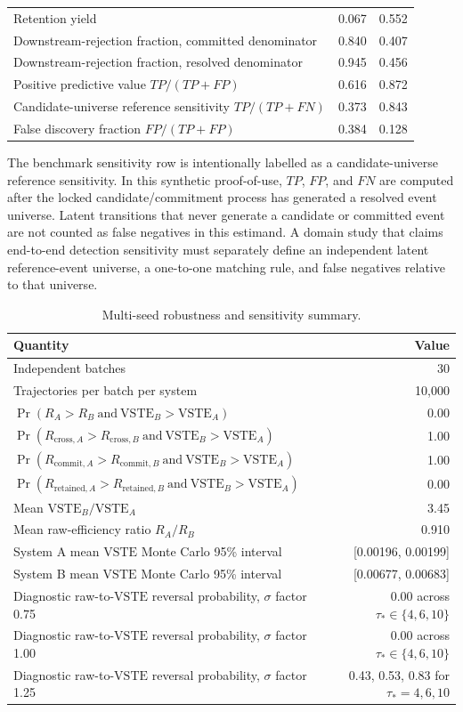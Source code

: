 \documentclass[11pt,a4paper]{article}
\newcommand{\VSTE}{\ensuremath{\mathrm{VSTE}}}
\newcommand{\1}{\mathbf{1}}
\begin{document}
\begin{table}[h]
\begin{tabular}{lrr}
Retention yield & 0.067 & 0.552 \\
Downstream-rejection fraction, committed denominator & 0.840 & 0.407 \\
Downstream-rejection fraction, resolved denominator & 0.945 & 0.456 \\
Positive predictive value $TP/(TP+FP)$ & 0.616 & 0.872 \\
Candidate-universe reference sensitivity $TP/(TP+FN)$ & 0.373 & 0.843 \\
False discovery fraction $FP/(TP+FP)$ & 0.384 & 0.128 \\
\bottomrule
\end{tabular}
\end{table}

The benchmark sensitivity row is intentionally labelled as a candidate-universe
reference sensitivity. In this synthetic proof-of-use, $TP$, $FP$, and $FN$ are
computed after the locked candidate/commitment process has generated a resolved
event universe. Latent transitions that never generate a candidate or committed
event are not counted as false negatives in this estimand. A domain study that
claims end-to-end detection sensitivity must separately define an independent
latent reference-event universe, a one-to-one matching rule, and false negatives
relative to that universe.

\begin{table}[h]
\centering
\caption{Multi-seed robustness and sensitivity summary.}
\label{tab:hmm-robustness}
\begin{tabular}{lr}
\toprule
Quantity & Value \\
\midrule
Independent batches & 30 \\
Trajectories per batch per system & 10,000 \\
$\Pr(R_A>R_B\ \mathrm{and}\ \VSTE_B>\VSTE_A)$ & 0.00 \\
$\Pr(R_{\mathrm{cross},A}>R_{\mathrm{cross},B}\ \mathrm{and}\ \VSTE_B>\VSTE_A)$ & 1.00 \\
$\Pr(R_{\mathrm{commit},A}>R_{\mathrm{commit},B}\ \mathrm{and}\ \VSTE_B>\VSTE_A)$ & 1.00 \\
$\Pr(R_{\mathrm{retained},A}>R_{\mathrm{retained},B}\ \mathrm{and}\ \VSTE_B>\VSTE_A)$ & 0.00 \\
Mean $\VSTE_B/\VSTE_A$ & 3.45 \\
Mean raw-efficiency ratio $R_A/R_B$ & 0.910 \\
System A mean \VSTE{} Monte Carlo 95\% interval & [0.00196, 0.00199] \\
System B mean \VSTE{} Monte Carlo 95\% interval & [0.00677, 0.00683] \\
Diagnostic raw-to-\VSTE{} reversal probability, $\sigma$ factor 0.75 & 0.00 across $\tau_\ast\in\{4,6,10\}$ \\
Diagnostic raw-to-\VSTE{} reversal probability, $\sigma$ factor 1.00 & 0.00 across $\tau_\ast\in\{4,6,10\}$ \\
Diagnostic raw-to-\VSTE{} reversal probability, $\sigma$ factor 1.25 & 0.43, 0.53, 0.83 for $\tau_\ast=4,6,10$ \\
\bottomrule
\end{tabular}
\end{table}
\end{document}
